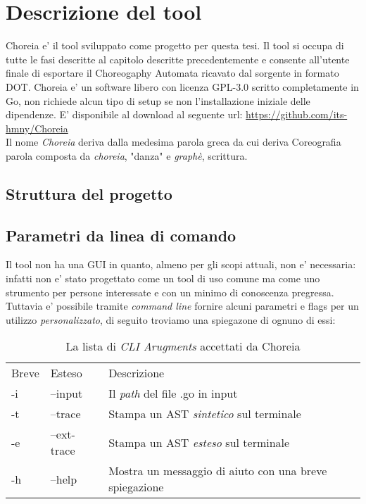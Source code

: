 \chapter{Descrizione del tool}
Choreia e' il tool sviluppato come progetto per questa tesi. Il tool si occupa di tutte le fasi descritte al capitolo descritte precedentemente e consente all'utente finale di esportare il Choreogaphy Automata ricavato dal sorgente in formato DOT.
Choreia e' un software libero con licenza GPL-3.0 scritto completamente in Go, non richiede alcun tipo di setup se non l'installazione iniziale delle dipendenze. E' disponibile al download al seguente url: \url{https://github.com/its-hmny/Choreia} \\
Il nome \emph{Choreia} deriva dalla medesima parola greca da cui deriva Coreografia parola composta da \emph{choreia}, "danza" e \emph{graphè}, scrittura.

\section{Struttura del progetto}

\section{Parametri da linea di comando}
Il tool non ha una GUI in quanto, almeno per gli scopi attuali, non e' necessaria: infatti non e' stato progettato come un tool di uso comune ma come uno strumento per persone interessate e con un minimo di conoscenza pregressa.\\
Tuttavia e' possibile tramite \emph{command line} fornire alcuni parametri e flags per un utilizzo \emph{personalizzato}, di seguito troviamo una spiegazone di ognuno di essi:
\begin{table}[h!]
    \centering
    \begin{tabular}{l l l}
        Breve & Esteso      & Descrizione                                            \\
        -i    & --input     & Il \emph{path} del file .go in input                   \\
        -t    & --trace     & Stampa un AST \emph{sintetico} sul terminale           \\
        -e    & --ext-trace & Stampa un AST \emph{esteso} sul terminale              \\
        -h    & --help      & Mostra un messaggio di aiuto con una breve spiegazione \\
    \end{tabular}
    \caption{La lista di \emph{CLI Arugments} accettati da Choreia}
\end{table}

